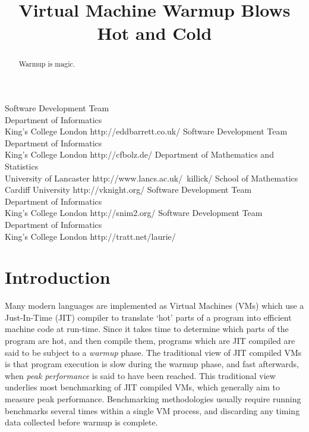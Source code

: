 \documentclass[10pt,preprint]{sigplanconf}
\begin{document}
\title{Virtual Machine Warmup Blows Hot and Cold}
           {Software Development Team\\ Department of Informatics\\ King's College London}
           {http://eddbarrett.co.uk/}
           {Software Development Team\\ Department of Informatics\\ King's College London}
           {http://cfbolz.de/}
           {Department of Mathematics and Statistics\\ University of Lancaster}
           {http://www.lancs.ac.uk/~killick/}
           {School of Mathematics\\ Cardiff University}
           {http://vknight.org/}
           {Software Development Team\\ Department of Informatics\\ King's College London}
           {http://snim2.org/}
           {Software Development Team\\ Department of Informatics\\ King's College London}
           {http://tratt.net/laurie/}
\maketitle

\begin{abstract}
Warmup is magic.
\end{abstract}

\section{Introduction}
\label{sec:intro}



Many modern languages are implemented as Virtual Machines (VMs) which use a
Just-In-Time (JIT) compiler to translate `hot' parts of a program into efficient
machine code at run-time. Since it takes time to determine which parts of the
program are hot, and then compile them, programs which are JIT compiled are
said to be subject to a \emph{warmup} phase. The traditional view of
JIT compiled VMs is that program execution is slow during the warmup phase, and
fast afterwards, when \emph{peak performance} is said to have been reached.
This traditional view underlies most benchmarking of JIT compiled VMs, which
generally aim to measure peak performance. Benchmarking methodologies usually
require running benchmarks several times within a single VM process, and
discarding any timing data collected before warmup is complete.
\end{document}
